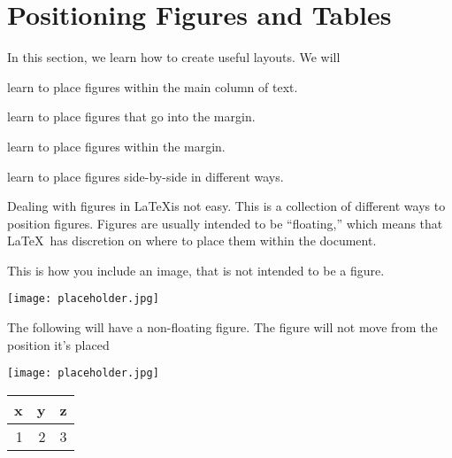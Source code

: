 \documentclass[10pt,oneside]{book}
\begin{document}





\newpage


\section{Positioning Figures and Tables}


\begin{objectives}{In this section, we learn how to create useful layouts. We will}
    \item
      learn to place figures within the main column of text.
    \item
      learn to place figures that go into the margin.
    \item
      learn to place figures within the margin.
    \item
      learn to place figures side-by-side in different ways.
  \end{objectives}


Dealing with figures in \LaTeX is not easy.  This is a collection of different 
ways to position figures.  Figures are usually intended to be ``floating,'' which
means that \LaTeX\ has discretion on where to place them within the document.


This is how you include an image, that is not intended to be a figure.

\texttt{[image: placeholder.jpg]}

The following will have a non-floating figure. The figure will not move from the position it's placed

\noindent
\begin{minipage}{0.9\linewidth}
  \centering
  \texttt{[image: placeholder.jpg]}
  \label{fig:notfloatfig}
\end{minipage}



\begin{margintable}
  \centering
  \begin{tabular}{rrr}
    \toprule
    x & y & z \\
    \midrule
    1 & 2 & 3 \\
    \bottomrule
  \end{tabular}
  \caption{This is a caption for a table that will be placed in the margin.}\label{tab:tableexample1}
  \label{tab:margintab}
\end{margintable}
\end{document}
